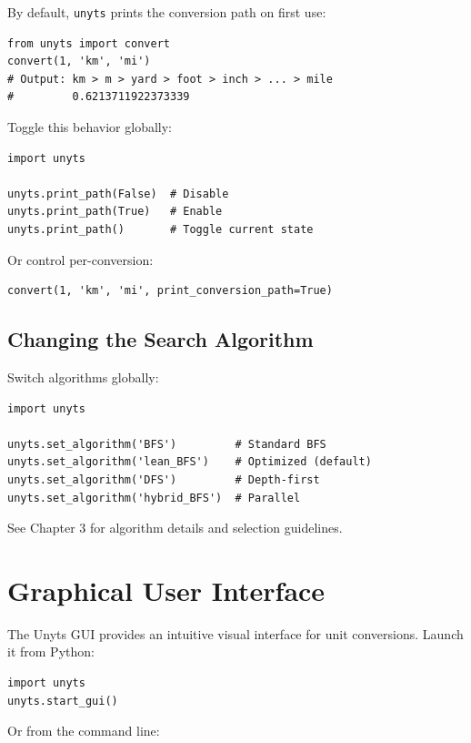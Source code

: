 \documentclass[11pt,a4paper]{report}
\begin{document}
By default, \texttt{unyts} prints the conversion path on first use:

\begin{lstlisting}[style=pythonstyle]
from unyts import convert
convert(1, 'km', 'mi')
# Output: km > m > yard > foot > inch > ... > mile
#         0.6213711922373339
\end{lstlisting}

Toggle this behavior globally:

\begin{lstlisting}[style=pythonstyle]
import unyts

unyts.print_path(False)  # Disable
unyts.print_path(True)   # Enable
unyts.print_path()       # Toggle current state
\end{lstlisting}

Or control per-conversion:

\begin{lstlisting}[style=pythonstyle]
convert(1, 'km', 'mi', print_conversion_path=True)
\end{lstlisting}

\section{Changing the Search Algorithm}

Switch algorithms globally:

\begin{lstlisting}[style=pythonstyle]
import unyts

unyts.set_algorithm('BFS')         # Standard BFS
unyts.set_algorithm('lean_BFS')    # Optimized (default)
unyts.set_algorithm('DFS')         # Depth-first
unyts.set_algorithm('hybrid_BFS')  # Parallel
\end{lstlisting}

See Chapter 3 for algorithm details and selection guidelines.



\chapter{Graphical User Interface}

The Unyts GUI provides an intuitive visual interface for unit conversions. Launch it from Python:

\begin{lstlisting}[style=pythonstyle]
import unyts
unyts.start_gui()
\end{lstlisting}

Or from the command line:
\end{document}
